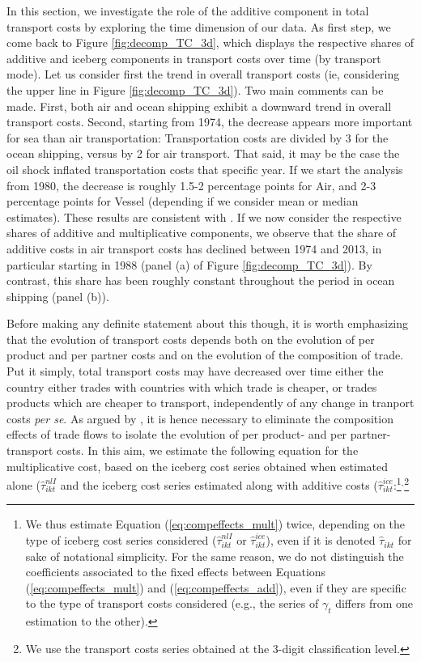 \documentclass[a4paper,11pt]{article}
\begin{document}
In this section, we investigate the role of the additive component in total transport costs by exploring the time dimension of our data. As first step, we come back to Figure \ref{fig:decomp_TC_3d}, which displays the respective shares of additive and iceberg components in transport costs over time (by transport mode). 
Let us consider first the trend in overall transport costs (ie, considering the upper line in Figure \ref{fig:decomp_TC_3d}). Two main comments can be made. First, both air and ocean shipping exhibit a downward trend in overall transport costs. Second, starting from 1974, the decrease appears more important for sea than air transportation: Transportation costs are divided by 3 for the ocean shipping, versus by 2 for air transport. That said, it may be the case the oil shock inflated transportation costs that specific year. If we start the analysis from 1980, the decrease is roughly 1.5-2 percentage points for Air, and 2-3 percentage points for Vessel (depending if we consider mean or median estimates). These results are consistent with \citet{hummels2007}. If we now consider the respective shares of additive and multiplicative components, we observe that the share of additive costs in air transport costs has declined between 1974 and 2013, in particular starting in 1988 (panel (a) of Figure \ref{fig:decomp_TC_3d}). By contrast, this share has been roughly constant throughout the period in ocean shipping (panel (b)). 

Before making any definite statement about this though, it is worth emphasizing that the evolution of 
transport costs depends both on the evolution of per product and per partner costs and on the evolution of the composition of trade. Put it simply, total transport costs may have decreased over time either the country either trades with countries with which trade is cheaper, or trades products which are cheaper to transport, independently of any change in tranport costs \textit{per se}. As argued by \citet{hummels2007}, it is hence necessary to eliminate the composition effects of trade flows to isolate the evolution of per product- and per partner- transport costs. In this aim, we estimate the following equation for the multiplicative cost, based on the iceberg cost series obtained when estimated alone ($\widehat{\tau}_{ikt}^{nlI}$ and the iceberg cost series estimated along with additive costs ($\widehat{\tau}_{ikt}^{ice}$:\footnote{We thus estimate Equation (\ref{eq:compeffects_mult}) twice, depending on the type of iceberg cost series considered ($\widehat{\tau}_{ikt}^{nlI}$ or $\widehat{\tau}_{ikt}^{ice}$), even if it is denoted $\widehat{\tau}_{ikt}$ for sake of notational simplicity. For the same reason, we do not distinguish the coefficients associated to the fixed effects between Equations (\ref{eq:compeffects_mult}) and (\ref{eq:compeffects_add}), even if they are specific to the type of transport costs considered (e.g., the series of $\gamma_t$ differs from one estimation to the other).}$^{,}$\footnote{We use the transport costs series obtained at the 3-digit classification level.}
\end{document}
